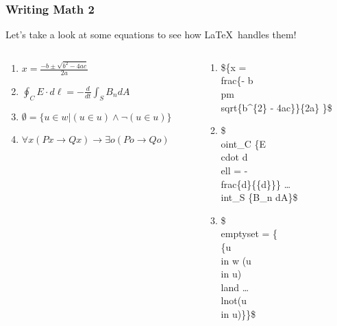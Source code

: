 \documentclass{beamer}
\begin{document}
\begin{frame}[fragile]
	\frametitle{Writing Math 2}
	Let's take a look at some equations to see how \LaTeX\ handles them! \bigskip
\begin{columns}
	\hspace{-20pt}
	\begin{column}{0.57\textwidth}
		\begin{enumerate}
				\item ${x = \frac{- b \pm \sqrt{b^{2} - 4ac}}{2a} }$
				\item $\oint_C {E \cdot d\ell = - \frac{d}{{dt}}} \int_S {B_n dA}$
				\item $\emptyset = {\{u \in w | (u \in u) \land \lnot(u \in u)}\}$
				\item $\forall x(Px \to Qx)\to\exists o(Po \to Qo)$
		\end{enumerate}
	\end{column}
	\hspace{0pt}
	\begin{column}{0.55\textwidth}
	\begin{enumerate}
		\item {\begin{semiverbatim}\begin{tiny}
\$\{x = \\frac\{- b \\pm \\sqrt\{b^\{2\} - 4ac\}\}\{2a\} \}\$
				\end{tiny} \end{semiverbatim}}
		\item {\begin{semiverbatim}\begin{tiny}
				\$\\oint_C \{E \\cdot d\\ell = - \\frac\{d\}\{\{d\}\}\} \dots 
				\\int_S \{B_n dA\}\$			
				\end{tiny}\end{semiverbatim}}
		\item {\begin{semiverbatim}\begin{tiny}
				\$\\emptyset = \{\\\{u \\in w \textbar (u \\in u) \\land \dots
				\\lnot(u \\in u)\}\}\$			

\end{tiny}
\end{semiverbatim}}
\end{enumerate}
\end{column}
\end{columns}
\end{frame}
\end{document}
